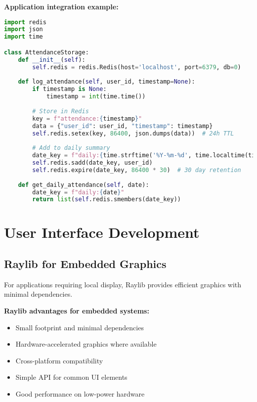 \textbf{Application integration example:}
\begin{tcolorbox}[colback=gray!5,colframe=gray!50,title=Redis Usage Pattern]
\begin{lstlisting}[language=Python,basicstyle=\small\ttfamily]
import redis
import json
import time

class AttendanceStorage:
    def __init__(self):
        self.redis = redis.Redis(host='localhost', port=6379, db=0)
        
    def log_attendance(self, user_id, timestamp=None):
        if timestamp is None:
            timestamp = int(time.time())
            
        # Store in Redis
        key = f"attendance:{timestamp}"
        data = {"user_id": user_id, "timestamp": timestamp}
        self.redis.setex(key, 86400, json.dumps(data))  # 24h TTL
        
        # Add to daily summary
        date_key = f"daily:{time.strftime('%Y-%m-%d', time.localtime(timestamp))}"
        self.redis.sadd(date_key, user_id)
        self.redis.expire(date_key, 86400 * 30)  # 30 day retention
        
    def get_daily_attendance(self, date):
        date_key = f"daily:{date}"
        return list(self.redis.smembers(date_key))
\end{lstlisting}
\end{tcolorbox}

\section{User Interface Development}

\subsection{Raylib for Embedded Graphics}

For applications requiring local display, Raylib provides efficient graphics with minimal dependencies.

\textbf{Raylib advantages for embedded systems:}
\begin{itemize}
\item Small footprint and minimal dependencies
\item Hardware-accelerated graphics where available
\item Cross-platform compatibility
\item Simple API for common UI elements
\item Good performance on low-power hardware
\end{itemize}

